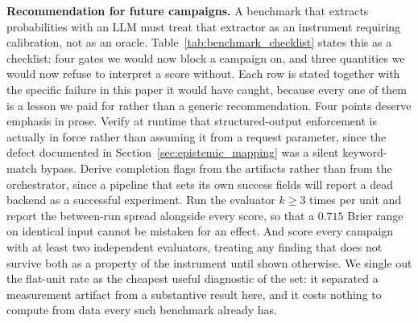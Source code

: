 \documentclass[11pt,journal,onecolumn]{IEEEtran}
\begin{document}
\textbf{Recommendation for future campaigns.} A benchmark that extracts probabilities with an LLM must treat that extractor as an instrument requiring calibration, not as an oracle. Table~\ref{tab:benchmark_checklist} states this as a checklist: four gates we would now block a campaign on, and three quantities we would now refuse to interpret a score without. Each row is stated together with the specific failure in this paper it would have caught, because every one of them is a lesson we paid for rather than a generic recommendation. Four points deserve emphasis in prose. Verify at runtime that structured-output enforcement is actually in force rather than assuming it from a request parameter, since the defect documented in Section~\ref{sec:epistemic_mapping} was a silent keyword-match bypass. Derive completion flags from the artifacts rather than from the orchestrator, since a pipeline that sets its own success fields will report a dead backend as a successful experiment. Run the evaluator $k \geq 3$ times per unit and report the between-run spread alongside every score, so that a $0.715$ Brier range on identical input cannot be mistaken for an effect. And score every campaign with at least two independent evaluators, treating any finding that does not survive both as a property of the instrument until shown otherwise. We single out the flat-unit rate as the cheapest useful diagnostic of the set: it separated a measurement artifact from a substantive result here, and it costs nothing to compute from data every such benchmark already has.
\end{document}
